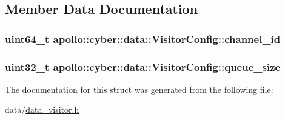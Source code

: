 \subsection{Member Data Documentation}
\hypertarget{structapollo_1_1cyber_1_1data_1_1VisitorConfig_a57a779eef939539f65e70a9b6df578c0}{
\subsubsection[{channel\-\_\-id}]{\setlength{\rightskip}{0pt plus 5cm}uint64\-\_\-t apollo\-::cyber\-::data\-::\-Visitor\-Config\-::channel\-\_\-id}}\label{structapollo_1_1cyber_1_1data_1_1VisitorConfig_a57a779eef939539f65e70a9b6df578c0}
\hypertarget{structapollo_1_1cyber_1_1data_1_1VisitorConfig_aab5f101dd3dedc29cbcbec47257beaf3}{
\subsubsection[{queue\-\_\-size}]{\setlength{\rightskip}{0pt plus 5cm}uint32\-\_\-t apollo\-::cyber\-::data\-::\-Visitor\-Config\-::queue\-\_\-size}}\label{structapollo_1_1cyber_1_1data_1_1VisitorConfig_aab5f101dd3dedc29cbcbec47257beaf3}


The documentation for this struct was generated from the following file\-:\begin{DoxyCompactItemize}
\item 
data/\hyperlink{data__visitor_8h}{data\-\_\-visitor.\-h}\end{DoxyCompactItemize}
